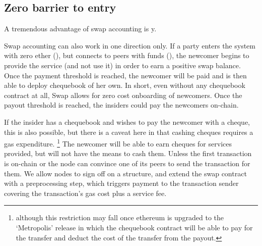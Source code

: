 % 
% 

\subsection{Zero barrier to entry}

A tremendous advantage of swap accounting is  y.

Swap accounting can also work in one direction only. If a party enters the system with zero ether (), but connects to peers with funds (), the newcomer begins to provide the service (and not use it) in order to earn a positive swap balance. Once the payment threshold is reached, the newcomer will be paid and is then able to deploy chequebook of her own.
In short, even without any chequebook contract at all, Swap allows for zero cost onboarding of newcomers. Once the payout threshold is reached, the insiders could pay the newcomers on-chain. 

If the insider has a chequebook and wishes to pay the newcomer with a cheque, this is also possible, but there is a caveat here in that cashing cheques requires a gas expenditure.%
%
\footnote{although this restriction may fall once ethereum is upgraded to the `Metropolis' release in which the chequebook contract will be able to pay for the transfer and deduct the cost of the transfer from the payout.}
%
The newcomer will be able to earn cheques for services provided, but will not have the means to cash them. 
Unless the first transaction is on-chain or the node can convince one of its peers to send the transaction for them.
We allow nodes to sign off on a structure, and extend the swap contract with a preprocessing step, which 
triggers payment to the transaction sender covering the transaction's gas cost plus a service fee. 
  
